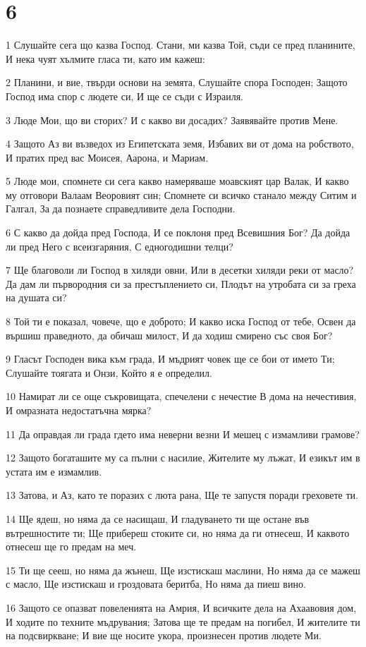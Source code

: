 \chapter{6}

\par 1 Слушайте сега що казва Господ. Стани, ми казва Той, съди се пред планините, И нека чуят хълмите гласа ти, като им кажеш:
\par 2 Планини, и вие, твърди основи на земята, Слушайте спора Господен; Защото Господ има спор с людете си, И ще се съди с Израиля.
\par 3 Люде Мои, що ви сторих? И с какво ви досадих? Заявявайте против Мене.
\par 4 Защото Аз ви възведох из Египетската земя, Избавих ви от дома на робството, И пратих пред вас Моисея, Аарона, и Мариам.
\par 5 Люде мои, спомнете си сега какво намеряваше моавският цар Валак, И какво му отговори Валаам Веоровият син; Спомнете си всичко станало между Ситим и Галгал, За да познаете справедливите дела Господни.
\par 6 С какво да дойда пред Господа, И се поклоня пред Всевишния Бог? Да дойда ли пред Него с всеизгаряния, С едногодишни телци?
\par 7 Ще благоволи ли Господ в хиляди овни, Или в десетки хиляди реки от масло? Да дам ли първородния си за престъплението си, Плодът на утробата си за греха на душата си?
\par 8 Той ти е показал, човече, що е доброто; И какво иска Господ от тебе, Освен да вършиш праведното, да обичаш милост, И да ходиш смирено със своя Бог?
\par 9 Гласът Господен вика към града, И мъдрият човек ще се бои от името Ти; Слушайте тоягата и Онзи, Който я е определил.
\par 10 Намират ли се още съкровищата, спечелени с нечестие В дома на нечестивия, И омразната недостатъчна мярка?
\par 11 Да оправдая ли града гдето има неверни везни И мешец с измамливи грамове?
\par 12 Защото богаташите му са пълни с насилие, Жителите му лъжат, И езикът им в устата им е измамлив.
\par 13 Затова, и Аз, като те поразих с люта рана, Ще те запустя поради греховете ти.
\par 14 Ще ядеш, но няма да се насищаш, И гладуването ти ще остане във вътрешностите ти; Ще прибереш стоките си, но няма да ги отнесеш, И каквото отнесеш ще го предам на меч.
\par 15 Ти ще сееш, но няма да жънеш, Ще изстискаш маслини, Но няма да се мажеш с масло, Ще изстискаш и гроздовата беритба, Но няма да пиеш вино.
\par 16 Защото се опазват повеленията на Амрия, И всичките дела на Ахаавовия дом, И ходите по техните мъдрувания; Затова ще те предам на погибел, И жителите ти на подсвиркване; И вие ще носите укора, произнесен против людете Ми.

